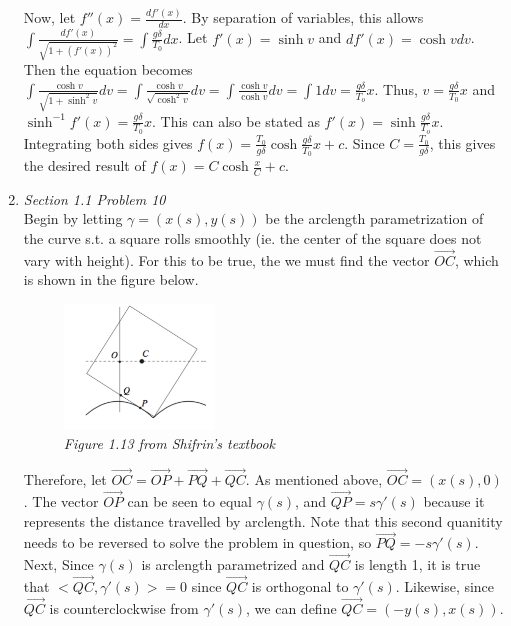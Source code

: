 \documentclass{article}
\begin{document}
\begin{enumerate}
Now, let $f''(x) = \frac{df'(x)}{dx}$.
By separation of variables, this allows $\displaystyle\int\frac{df'(x)}{\sqrt{1+(f'(x))^2}} = \displaystyle\int\frac{g\delta}{T_0}dx$.
Let $f'(x) = \sinh{v}$ and $df'(x) = \cosh{v}dv$.
Then the equation becomes $\displaystyle\int\frac{\cosh{v}}{\sqrt{1+\sinh^2{v}}}dv = \displaystyle\int\frac{\cosh{v}}{\sqrt{\cosh^2{v}}}dv = \displaystyle\int\frac{\cosh{v}}{\cosh{v}}dv = \int 1 dv = \frac{g\delta}{T_o}x$.
Thus, $v = \frac{g\delta}{T_0}x$ and $\sinh^{-1}{f'(x)} = \frac{g\delta}{T_0}x$.
This can also be stated as $f'(x) = \sinh{\frac{g\delta}{T_o}x}$.
Integrating both sides gives $f(x) = \frac{T_0}{g\delta}\cosh{\frac{g\delta}{T_0}x} + c$.
Since $C = \frac{T_0}{g\delta}$, this gives the desired result of $f(x) = C\cosh{\frac{x}{C}}+c$.

\item \textit{Section 1.1 Problem 10}\\
Begin by letting $\gamma = (x(s),y(s))$ be the arclength parametrization of the curve s.t. a square rolls smoothly (ie. the center of the square does not vary with height).
For this to be true, the we must find the vector $\overrightarrow{OC}$, which is shown in the figure below.
\begin{figure}[h]
\begin{center}
\includegraphics[width=4cm]{square}
\end{center}
\caption{\textit{Figure 1.13 from Shifrin's textbook}}
\end{figure}
Therefore, let $\overrightarrow{OC} = \overrightarrow{OP} + \overrightarrow{PQ} + \overrightarrow{QC}$. 
As mentioned above, $\overrightarrow{OC} = (x(s),0)$.
The vector $\overrightarrow{OP}$ can be seen to equal $\gamma(s)$, and $\overrightarrow{QP} = s\gamma'(s)$ because it represents the distance travelled by arclength.
Note that this second quanitity needs to be reversed to solve the problem in question, so $\overrightarrow{PQ} = -s\gamma'(s)$.
Next, Since $\gamma(s)$ is arclength parametrized and $\overrightarrow{QC}$ is length 1, it is true that $<\overrightarrow{QC},\gamma'(s)> = 0$ since $\overrightarrow{QC}$ is orthogonal to $\gamma'(s)$.
Likewise, since $\overrightarrow{QC}$ is counterclockwise from $\gamma'(s)$, we can define $\overrightarrow{QC} = (-y(s),x(s))$.

\end{enumerate}
\end{document}
